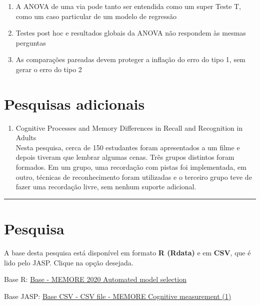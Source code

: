 \documentclass[
]{book}
\providecommand{\tightlist}{%
  \setlength{\itemsep}{0pt}\setlength{\parskip}{0pt}}
\begin{document}
\begin{explore}

\begin{enumerate}
\def\labelenumi{\arabic{enumi}.}
\tightlist
\item
  A ANOVA de uma via pode tanto ser entendida como um super Teste T,
  como um caso particular de um modelo de regressão\\
\item
  Testes post hoc e resultados globais da ANOVA não respondem às mesmas
  perguntas\\
\item
  As comparações pareadas devem proteger a inflação do erro do tipo 1,
  sem gerar o erro do tipo 2\\
\end{enumerate}

\end{explore}

\hypertarget{pesquisas-adicionais-3}{%
\section{Pesquisas adicionais}\label{pesquisas-adicionais-3}}

\begin{enumerate}
\def\labelenumi{\arabic{enumi}.}
\tightlist
\item
  Cognitive Processes and Memory Differences in Recall and Recognition
  in Adults\\
  Nesta pesquisa, cerca de 150 estudantes foram apresentados a um filme
  e depois tiveram que lembrar algumas cenas. Três grupos distintos
  foram formados. Em um grupo, uma recordação com pistas foi
  implementada, em outro, técnicas de reconhecimento foram utilizadas e
  o terceiro grupo teve de fazer uma recordação livre, sem nenhum
  suporte adicional.
\end{enumerate}

\begin{center}\rule{0.5\linewidth}{0.5pt}\end{center}

\hypertarget{pesquisa-4}{%
\section{Pesquisa}\label{pesquisa-4}}

\begin{base}

A base desta pesquisa está disponível em formato \textbf{R (Rdata)} e em
\textbf{CSV}, que é lido pelo JASP. Clique na opção desejada.

Base R:
\href{https://github.com/anovabr/mqt/raw/master/bases/Base\%20-\%20MEMORE\%202020\%20Automated\%20model\%20selection.RData}{Base
- MEMORE 2020 Automated model selection}

Base JASP:
\href{https://github.com/anovabr/mqt/raw/master/bases/bases_csv_jasp.zip}{Base
CSV - CSV file - MEMORE Cognitive measurement (1)}

\end{base}
\end{document}
